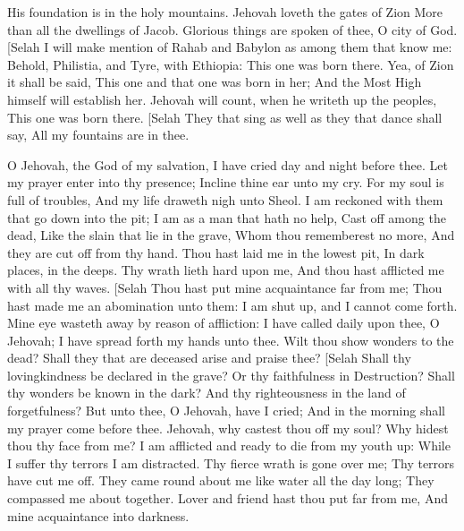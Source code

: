 His foundation is in the holy mountains.  Jehovah loveth the gates of Zion More than all the dwellings of Jacob.  Glorious things are spoken of thee, O city of God. [Selah  I will make mention of Rahab and Babylon as among them that know me: Behold, Philistia, and Tyre, with Ethiopia: This one was born there.  Yea, of Zion it shall be said, This one and that one was born in her; And the Most High himself will establish her.  Jehovah will count, when he writeth up the peoples, This one was born there. [Selah  They that sing as well as they that dance shall say, All my fountains are in thee. 

O Jehovah, the God of my salvation, I have cried day and night before thee.  Let my prayer enter into thy presence; Incline thine ear unto my cry.  For my soul is full of troubles, And my life draweth nigh unto Sheol.  I am reckoned with them that go down into the pit; I am as a man that hath no help,  Cast off among the dead, Like the slain that lie in the grave, Whom thou rememberest no more, And they are cut off from thy hand.  Thou hast laid me in the lowest pit, In dark places, in the deeps.  Thy wrath lieth hard upon me, And thou hast afflicted me with all thy waves. [Selah  Thou hast put mine acquaintance far from me; Thou hast made me an abomination unto them: I am shut up, and I cannot come forth.  Mine eye wasteth away by reason of affliction: I have called daily upon thee, O Jehovah; I have spread forth my hands unto thee.  Wilt thou show wonders to the dead? Shall they that are deceased arise and praise thee? [Selah  Shall thy lovingkindness be declared in the grave? Or thy faithfulness in Destruction?  Shall thy wonders be known in the dark? And thy righteousness in the land of forgetfulness?  But unto thee, O Jehovah, have I cried; And in the morning shall my prayer come before thee.  Jehovah, why castest thou off my soul? Why hidest thou thy face from me?  I am afflicted and ready to die from my youth up: While I suffer thy terrors I am distracted.  Thy fierce wrath is gone over me; Thy terrors have cut me off.  They came round about me like water all the day long; They compassed me about together.  Lover and friend hast thou put far from me, And mine acquaintance into darkness. 

